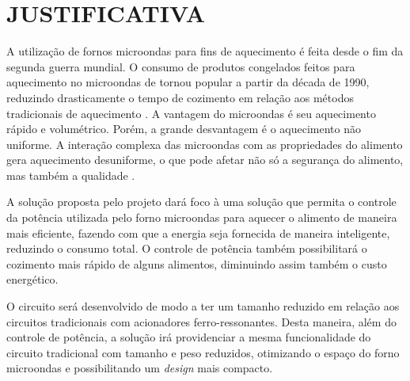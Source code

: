 \section{JUSTIFICATIVA}
\label{sec:justificativa}

A utilização de fornos microondas para fins de aquecimento é feita desde o fim da segunda guerra mundial. O consumo de produtos congelados feitos para aquecimento no microondas de tornou popular a partir da década de 1990, reduzindo drasticamente o tempo de cozimento em relação aos métodos tradicionais de aquecimento \cite{Ohlsson}. A vantagem do microondas é seu aquecimento rápido e volumétrico. Porém, a grande desvantagem é o aquecimento não uniforme. A interação complexa das microondas com as propriedades do alimento gera aquecimento desuniforme, o que pode afetar não só a segurança do alimento, mas também a qualidade \cite{Ma}.

A solução proposta pelo projeto dará foco à uma solução que permita o controle da potência utilizada pelo forno microondas para aquecer o alimento de maneira mais eficiente, fazendo com que a energia seja fornecida de maneira inteligente, reduzindo o consumo total. O controle de potência também possibilitará o cozimento mais rápido de alguns alimentos, diminuindo assim também o custo energético.

O circuito será desenvolvido de modo a ter um tamanho reduzido em relação aos circuitos tradicionais com acionadores ferro-ressonantes. Desta maneira, além do controle de potência, a solução irá providenciar a mesma funcionalidade do circuito tradicional com tamanho e peso reduzidos, otimizando o espaço do forno microondas e possibilitando um \textit{design} mais compacto.